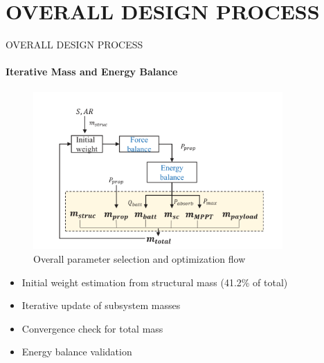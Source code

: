 \documentclass{beamer}
\begin{document}
\section{OVERALL DESIGN PROCESS} 
\begin{frame}{OVERALL DESIGN PROCESS}
    \framesubtitle{Iterative Mass and Energy Balance}
    
    \begin{figure}
        \centering
        \includegraphics[width=0.85\textwidth]{design_process.png}
        \caption{Overall parameter selection and optimization flow}
    \end{figure}
    
    \begin{itemize}
        \item Initial weight estimation from structural mass (41.2\% of total)
        \item Iterative update of subsystem masses
        \item Convergence check for total mass
        \item Energy balance validation
    \end{itemize}
\end{frame}
\end{document}
